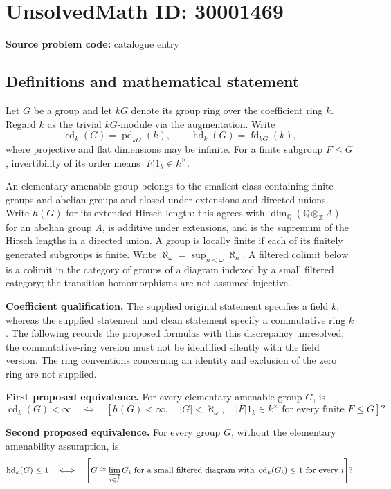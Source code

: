 \documentclass[11pt]{article}
\newcommand{\Z}{\mathbb{Z}}
\newcommand{\Q}{\mathbb{Q}}
\begin{document}
\section*{UnsolvedMath ID: 30001469}
\textbf{Source problem code:} catalogue entry
\subsection{Definitions and mathematical statement}
Let \(G\) be a group and let \(kG\) denote its group ring over the coefficient ring \(k\). Regard \(k\) as the trivial \(kG\)-module via the augmentation. Write
\[
\operatorname{cd}_k(G)=\operatorname{pd}_{kG}(k),\qquad
\operatorname{hd}_k(G)=\operatorname{fd}_{kG}(k),
\]
where projective and flat dimensions may be infinite. For a finite subgroup \(F\leq G\), invertibility of its order means \(|F|1_k\in k^\times\).

An elementary amenable group belongs to the smallest class containing finite groups and abelian groups and closed under extensions and directed unions. Write \(h(G)\) for its extended Hirsch length: this agrees with \(\dim_{\Q}(\Q\otimes_{\Z}A)\) for an abelian group \(A\), is additive under extensions, and is the supremum of the Hirsch lengths in a directed union. A group is locally finite if each of its finitely generated subgroups is finite. Write \(\aleph_\omega=\sup_{n<\omega}\aleph_n\). A filtered colimit below is a colimit in the category of groups of a diagram indexed by a small filtered category; the transition homomorphisms are not assumed injective.

\textbf{Coefficient qualification.} The supplied original statement specifies a field \(k\), whereas the supplied statement and clean statement specify a commutative ring \(k\). The following records the proposed formulas with this discrepancy unresolved; the commutative-ring version must not be identified silently with the field version. The ring conventions concerning an identity and exclusion of the zero ring are not supplied.

\textbf{First proposed equivalence.} For every elementary amenable group \(G\), is
\[
\operatorname{cd}_k(G)<\infty
\quad\Longleftrightarrow\quad
\left[
 h(G)<\infty,\quad |G|<\aleph_\omega,\quad
 |F|1_k\in k^\times\text{ for every finite }F\leq G
\right]?
\]

\textbf{Second proposed equivalence.} For every group \(G\), without the elementary amenability assumption, is
\[
\operatorname{hd}_k(G)\leq 1
\quad\Longleftrightarrow\quad
\left[
 G\cong\varinjlim_{i\in I}G_i
 \text{ for a small filtered diagram with }
 \operatorname{cd}_k(G_i)\leq 1\text{ for every }i
\right]?
\]
\end{document}
